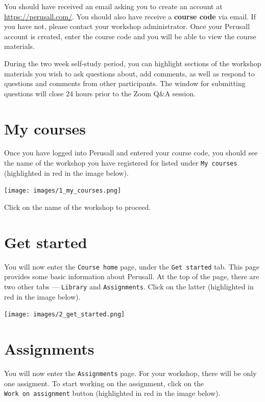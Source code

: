\documentclass[]{book}
\begin{document}
You should have received an email asking you to create an account at \url{https://perusall.com/}. You should also have receive a \textbf{course code} via email. If you have not, please contact your workshop administrator. Once your Perusall account is created, enter the course code and you will be able to view the course materials.

During the two week self-study period, you can highlight sections of the workshop materials you wish to ask questions about, add comments, as well as respond to questions and comments from other participants. The window for submitting questions will close 24 hours prior to the Zoom Q\&A session.

\hypertarget{my-courses}{%
\section{My courses}\label{my-courses}}

Once you have logged into Perusall and entered your course code, you should see the name of the workshop you have registered for listed under \texttt{My\ courses} (highlighted in red in the image below).

\texttt{[image: images/1\_my\_courses.png]}

Click on the name of the workshop to proceed.

\hypertarget{get-started}{%
\section{Get started}\label{get-started}}

You will now enter the \texttt{Course\ home} page, under the \texttt{Get\ started} tab. This page provides some basic information about Perusall. At the top of the page, there are two other tabs --- \texttt{Library} and \texttt{Assignments}. Click on the latter (highlighted in red in the image below).

\texttt{[image: images/2\_get\_started.png]}

\hypertarget{assignments}{%
\section{Assignments}\label{assignments}}

You will now enter the \texttt{Assignments} page. For your workshop, there will be only one assigment. To start working on the assignment, click on the \texttt{Work\ on\ assignment} button (highlighted in red in the image below).
\end{document}
